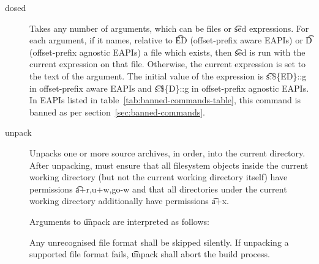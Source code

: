 \begin{description}
\item[dosed] Takes any number of arguments, which can be files or \t{sed} expressions. For each
    argument, if it names, relative to \t{ED} (offset-prefix aware EAPIs) or \t{D} (offset-prefix agnostic
    EAPIs) a file which exists, then \t{sed} is run with the current expression on that file. Otherwise,
    the current expression is set to the text of the argument. The initial value of the expression is
    \t{s:\$\{ED\}::g} in offset-prefix aware EAPIs and \t{s:\$\{D\}::g} in offset-prefix agnostic
    EAPIs. In EAPIs listed in table~\ref{tab:banned-commands-table}, this command is banned as per
    section~\ref{sec:banned-commands}.

\item[unpack] Unpacks one or more source archives, in order, into the current directory. After
    unpacking, must ensure that all filesystem objects inside the current working directory (but not
    the current working directory itself) have permissions \t{a+r,u+w,go-w} and that all directories
    under the current working directory additionally have permissions \t{a+x}.

    Arguments to \t{unpack} are interpreted as follows:

    Any unrecognised file format shall be skipped silently. If unpacking a supported file format
    fails, \t{unpack} shall abort the build process.


\end{description}
